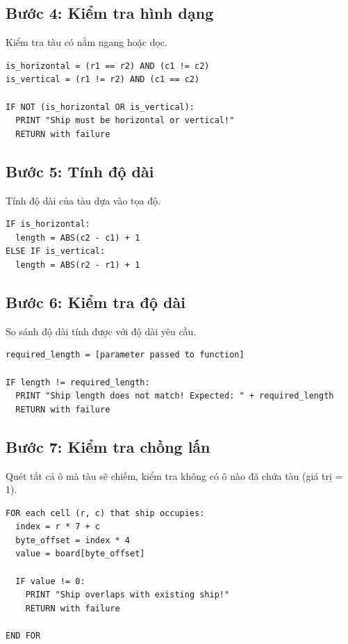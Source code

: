 \subsection{Bước 4: Kiểm tra hình dạng}

Kiểm tra tàu có nằm ngang hoặc dọc.

\begin{verbatim}
is_horizontal = (r1 == r2) AND (c1 != c2)
is_vertical = (r1 != r2) AND (c1 == c2)

IF NOT (is_horizontal OR is_vertical):
  PRINT "Ship must be horizontal or vertical!"
  RETURN with failure
\end{verbatim}

\subsection{Bước 5: Tính độ dài}

Tính độ dài của tàu dựa vào tọa độ.

\begin{verbatim}
IF is_horizontal:
  length = ABS(c2 - c1) + 1
ELSE IF is_vertical:
  length = ABS(r2 - r1) + 1
\end{verbatim}

\subsection{Bước 6: Kiểm tra độ dài}

So sánh độ dài tính được với độ dài yêu cầu.

\begin{verbatim}
required_length = [parameter passed to function]

IF length != required_length:
  PRINT "Ship length does not match! Expected: " + required_length
  RETURN with failure
\end{verbatim}

\subsection{Bước 7: Kiểm tra chồng lấn}

Quét tất cả ô mà tàu sẽ chiếm, kiểm tra không có ô nào đã chứa tàu (giá trị = 1).

\begin{verbatim}
FOR each cell (r, c) that ship occupies:
  index = r * 7 + c
  byte_offset = index * 4
  value = board[byte_offset]
  
  IF value != 0:
    PRINT "Ship overlaps with existing ship!"
    RETURN with failure

END FOR
\end{verbatim}

